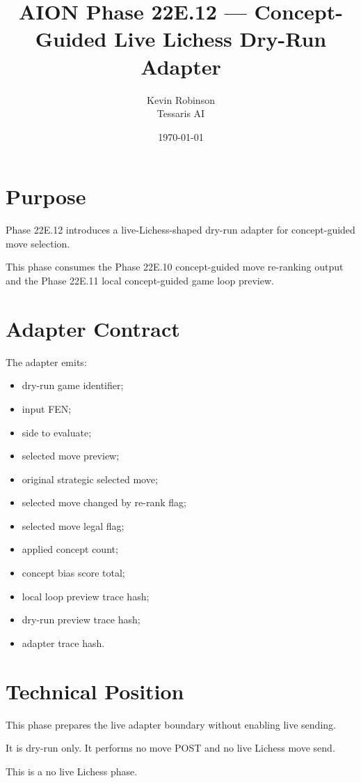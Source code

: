 \documentclass[11pt,a4paper]{article}
\title{\textbf{AION Phase 22E.12 --- Concept-Guided Live Lichess Dry-Run Adapter}}
\author{Kevin Robinson\\Tessaris AI}
\date{\today}
\begin{document}
\maketitle

\section{Purpose}

Phase 22E.12 introduces a live-Lichess-shaped dry-run adapter for concept-guided move selection.

This phase consumes the Phase 22E.10 concept-guided move re-ranking output and the Phase 22E.11 local concept-guided game loop preview.

\section{Adapter Contract}

The adapter emits:

\begin{itemize}[leftmargin=*]
  \item dry-run game identifier;
  \item input FEN;
  \item side to evaluate;
  \item selected move preview;
  \item original strategic selected move;
  \item selected move changed by re-rank flag;
  \item selected move legal flag;
  \item applied concept count;
  \item concept bias score total;
  \item local loop preview trace hash;
  \item dry-run preview trace hash;
  \item adapter trace hash.
\end{itemize}

\section{Technical Position}

This phase prepares the live adapter boundary without enabling live sending.

It is dry-run only. It performs no move POST and no live Lichess move send.

This is a no live Lichess phase.
\end{document}
